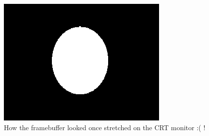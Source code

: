 \documentclass[book.tex]{subfiles}
\begin{document}
\begin{figure}[H]
  \centering
  \includegraphics[width=\textwidth]{imgs/circlescreen.png}
  \caption{How the framebuffer looked once stretched on the CRT monitor :( !}
\end{figure}
\par
\end{document}
